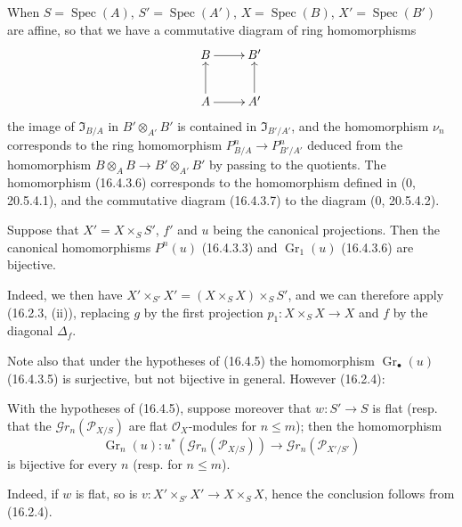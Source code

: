 \begin{env}[16.4.4]
\label{IV.16.4.4}
When $S=\operatorname{Spec}(A)$, $S'=\operatorname{Spec}(A')$,
$X=\operatorname{Spec}(B)$, $X'=\operatorname{Spec}(B')$ are affine, so
that we have a commutative diagram of ring homomorphisms
\[
  \xymatrix{
    B \ar[r] & B' \\
    A \ar[u] \ar[r] & A' \ar[u]
  }
\]
the image of $\mathfrak{I}_{B/A}$ in $B'\otimes_{A'}B'$ is contained in
$\mathfrak{I}_{B'/A'}$, and the homomorphism $\nu_n$ corresponds to the ring
homomorphism $P_{B/A}^n\to P_{B'/A'}^n$ deduced from the homomorphism
$B\otimes_A B\to B'\otimes_{A'}B'$ by passing to the quotients. The homomorphism
(16.4.3.6) corresponds to the homomorphism defined in (0, 20.5.4.1), and the
commutative diagram (16.4.3.7) to the diagram (0, 20.5.4.2).
\end{env}

\begin{proposition}[16.4.5]
\label{IV.16.4.5}
Suppose that $X'=X\times_S S'$, $f'$ and $u$ being the canonical projections.
Then the canonical homomorphisms $P^n(u)$ (16.4.3.3) and
$\operatorname{Gr}_1(u)$ (16.4.3.6) are bijective.
\end{proposition}

Indeed, we then have $X'\times_{S'}X'=(X\times_S X)\times_S S'$, and we can
therefore apply (16.2.3, (ii)), replacing $g$ by the first projection
$p_1:X\times_S X\to X$ and $f$ by the diagonal $\Delta_f$.

Note also that under the hypotheses of (16.4.5) the homomorphism
$\operatorname{Gr}_\bullet(u)$ (16.4.3.5) is surjective, but not bijective in
general. However (16.2.4):

\begin{corollary}[16.4.6]
\label{IV.16.4.6}
With the hypotheses of (16.4.5), suppose moreover that $w:S'\to S$ is
flat (resp. that the $\mathscr{G}r_n(\mathscr{P}_{X/S})$ are flat
$\mathcal{O}_X$-modules for $n\leq m$); then the homomorphism
\[
  \operatorname{Gr}_n(u):u^*(\mathscr{G}r_n(\mathscr{P}_{X/S}))
  \longrightarrow\mathscr{G}r_n(\mathscr{P}_{X'/S'})
\]
is bijective for every $n$ (resp. for $n\leq m$).
\end{corollary}

Indeed, if $w$ is flat, so is
$v:X'\times_{S'}X'\to X\times_S X$, hence the conclusion follows from (16.2.4).

